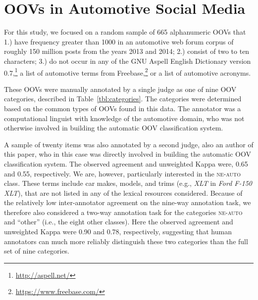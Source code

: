 \documentclass[10pt, a4paper]{article}
\newcommand{\tabref}[2][]{Table#1~\ref{#2}\xspace}
\begin{document}
\section{OOVs in Automotive Social Media}




For this study, we focused on a random sample of 665 alphanumeric OOVs
that 1.) have frequency greater than 1000 in an automotive web forum
corpus of roughly 150 million posts from the years 2013 and 2014; 2.)
consist of two to ten characters; 3.) do not occur in any of the GNU
Aspell English Dictionary version
0.7,\footnote{\url{http://aspell.net/}} a list of automotive terms
from Freebase,\footnote{\url{https://www.freebase.com/}} or a list of
automotive acronyms.

These OOVs were manually annotated by a single judge as one of nine
OOV categories, described in \tabref{tbl:categories}. The categories
were determined based on the common types of OOVs found in this
data. The annotator was a computational linguist with knowledge of the
automotive domain, who was not otherwise involved in building the
automatic OOV classification system.

A sample of twenty items was also annotated by a second judge, also an
author of this paper, who in this case was directly involved in
building the automatic OOV classification system. The observed
agreement and unweighted Kappa were, 0.65 and 0.55, respectively. We
are, however, particularly interested in the \textsc{ne-auto}
class. These terms include car makes, models, and trims (e.g.,
\emph{XLT} in \emph{Ford F-150 XLT}), that are not listed in any of the
lexical resources considered. Because of the relatively low
inter-annotator agreement on the nine-way annotation task, we
therefore also considered a two-way annotation task for the categories
\textsc{ne-auto} and ``other'' (i.e., the eight other classes). Here
the observed agreement and unweighted Kappa were 0.90 and 0.78,
respectively, suggesting that human annotators can much more reliably
distinguish these two categories than the full set of nine categories.
\end{document}
